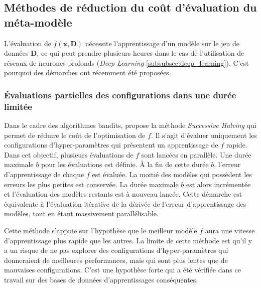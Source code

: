 
\subsection{Méthodes de réduction du coût d'évaluation du méta-modèle} \label{subsec:reduce_opt}
L'évaluation de $f(\boldsymbol{x}, \boldsymbol{D})$ nécessite l'apprentissage d'un modèle sur le jeu de données $\boldsymbol{D}$, ce qui peut prendre plusieurs heures dans le cas de l'utilisation de réseaux de neurones profonds (\textit{Deep Learning} \ref{subsubsec:deep_learning}).
C'est pourquoi des démarches ont récemment été proposées.

\subsubsection{Évaluations partielles des configurations dans une durée limitée} \label{subsubsec:successive_halving}
Dans le cadre des algorithmes bandits, \citeauthor{jamieson_nonstochastic_2015} \cite{jamieson_nonstochastic_2015} propose la méthode \textit{Successive Halving} qui permet de réduire le coût de l'optimisation de $f$.
Il s'agit d'évaluer uniquement les configurations d'hyper-paramètres qui présentent un apprentissage de $f$ rapide.
Dans cet objectif, plusieurs évaluations de $f$ sont lancées en parallèle.
Une durée maximale $b$ pour les évaluations est définie.
À la fin de cette durée $b$, l'erreur d'apprentissage de chaque $f$ est évaluée.
La moitié des modèles qui possèdent les erreurs les plus petites est conservée.
La durée maximale $b$ est alors incrémentée et l'évaluation des modèles restants est à nouveau lancée.
Cette démarche est équivalente à l'évaluation itérative de la dérivée de l'erreur d'apprentissage des modèles, tout en étant massivement parallélisable.

Cette méthode s'appuie sur l'hypothèse que le meilleur modèle $f$ aura une vitesse d'apprentissage plus rapide que les autres.
La limite de cette méthode est qu'il y a un risque de ne pas explorer des configurations d'hyper-paramètres qui donneraient de meilleures performances, mais qui sont plus lentes que de mauvaises configurations.
C'est une hypothèse forte qui a été vérifiée dans ce travail sur des bases de données d'apprentissages conséquentes.

